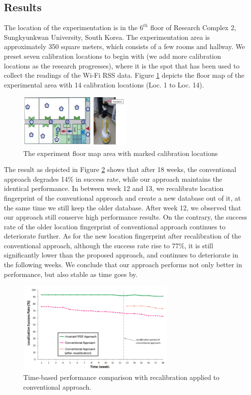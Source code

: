 \documentclass{ieeeaccess}
\begin{document}
\subsection{Results}
The location of the experimentation is in the $6^{th}$ floor of Research
Complex 2, Sungkyunkwan University, South Korea. The
experimentation area is approximately 350 square meters, which
consists of a few rooms and hallway. We preset seven calibration
locations to begin with (we add more calibration locations as the
research progresses), where it is the spot that has been used to
collect the readings of the Wi-Fi RSS data. Figure \ref{wifi_setup} depicts the
floor map of the experimental area with 14 calibration locations
(Loc. 1 to Loc. 14).

\begin{figure}[t!]
\centering
\label{wifi_setup}
\includegraphics[width=0.5\textwidth]{wifi_setup.png}
\caption{The experiment floor map area with marked
calibration locations}
\end{figure}

The result as depicted in Figure \ref{wifi_result} shows that after 18 weeks, the
conventional approach degrades 14\% in success rate, while our
approach maintains the identical performance. In between week
12 and 13, we recalibrate location fingerprint of the conventional
approach and create a new database out of it, at the same time we
still keep the older database. After week 12, we observed that our
approach still conserve high performance results. On the contrary,
the success rate of the older location fingerprint of conventional
approach continues to deteriorate further. As for the new location
fingerprint after recalibration of the conventional approach,
although the success rate rise to 77\%, it is still significantly lower
than the proposed approach, and continues to deteriorate in the
following weeks. We conclude that our approach performs not
only better in performance, but also stable as time goes by.

\begin{figure}[t!]
\centering
\label{wifi_result}
\includegraphics[width=0.7\textwidth]{wifi_result.png}
\caption{Time-based performance comparison with
recalibration applied to conventional approach.}
\end{figure}
\end{document}
